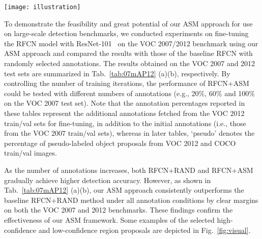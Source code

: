 \documentclass[journal]{IEEEtran}
\begin{document}
{\begin{figure*}[ptbp]
\center
\texttt{[image: illustration]}
\vspace{-5pt}
\caption{Selected examples from the COCO dataset. The first row shows high-confidence region proposals with pseudo-labels in red; the bottom row shows low-confidence region proposals in yellow, which required annotations from active users.}\label{fig:visual}
\vspace{-10pt}
\end{figure*}



To demonstrate the feasibility and great potential of our {ASM} approach for use on large-scale detection benchmarks, we conducted experiments on fine-tuning the RFCN model with ResNet-101~\cite{He_2016_CVPR} on the VOC 2007/2012 benchmark using our {ASM} approach and compared the results with those of the baseline RFCN with randomly selected annotations. The results obtained on the VOC 2007 and 2012 test sets are summarized in Tab.~\ref{tab:07mAP12} (a)(b), respectively. By controlling the number of training iterations, the performance of RFCN+{ASM} could be tested with different numbers of annotations (e.g., 20\%, 60\% and 100\% on the VOC 2007 test set). Note that the annotation percentages reported in these tables represent the additional annotations fetched from the VOC 2012 train/val sets for fine-tuning, in addition to the initial annotations (i.e., those from the VOC 2007 train/val sets), whereas in later tables, `pseudo' denotes the percentage of pseudo-labeled object proposals from VOC 2012 and COCO train/val images.

As the number of annotations increases, both RFCN+RAND and RFCN+{ASM} gradually achieve higher detection accuracy. However, as shown in Tab.~\ref{tab:07mAP12} (a)(b), our {ASM} approach consistently outperforms the baseline RFCN+RAND method under all annotation conditions {by clear margins on both the VOC 2007 and 2012 benchmarks}. These findings confirm the effectiveness of our {ASM} framework. Some examples of the selected high-confidence and low-confidence region proposals are depicted in Fig.~\ref{fig:visual}. 


}
\end{document}
